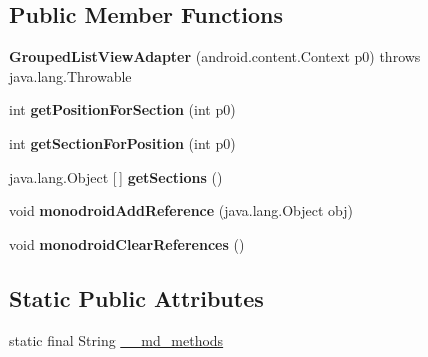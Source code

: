 \subsection*{Public Member Functions}
\begin{DoxyCompactItemize}
\item 
\mbox{\label{classmd5b60ffeb829f638581ab2bb9b1a7f4f3f_1_1GroupedListViewAdapter_ab328fe93ec4962ae6c34cea2a24a4897}} 
{\bfseries Grouped\+List\+View\+Adapter} (android.\+content.\+Context p0)  throws java.\+lang.\+Throwable 	
\item 
\mbox{\label{classmd5b60ffeb829f638581ab2bb9b1a7f4f3f_1_1GroupedListViewAdapter_af2a7abf78786d757e59276b12b020f80}} 
int {\bfseries get\+Position\+For\+Section} (int p0)
\item 
\mbox{\label{classmd5b60ffeb829f638581ab2bb9b1a7f4f3f_1_1GroupedListViewAdapter_a568104d4fe51eda51f33509906fb056d}} 
int {\bfseries get\+Section\+For\+Position} (int p0)
\item 
\mbox{\label{classmd5b60ffeb829f638581ab2bb9b1a7f4f3f_1_1GroupedListViewAdapter_a5303b39042c865b22540785f37da5a3e}} 
java.\+lang.\+Object \mbox{[}$\,$\mbox{]} {\bfseries get\+Sections} ()
\item 
\mbox{\label{classmd5b60ffeb829f638581ab2bb9b1a7f4f3f_1_1GroupedListViewAdapter_adbd6d6284566d262ab2a3d9a44e0f906}} 
void {\bfseries monodroid\+Add\+Reference} (java.\+lang.\+Object obj)
\item 
\mbox{\label{classmd5b60ffeb829f638581ab2bb9b1a7f4f3f_1_1GroupedListViewAdapter_a4634afbff45178960582fdfba5d55008}} 
void {\bfseries monodroid\+Clear\+References} ()
\end{DoxyCompactItemize}
\subsection*{Static Public Attributes}
\begin{DoxyCompactItemize}
\item 
static final String \hyperlink{classmd5b60ffeb829f638581ab2bb9b1a7f4f3f_1_1GroupedListViewAdapter_ae887eb8c51f6679bbffdba979210ff48}{\+\_\+\+\_\+md\+\_\+methods}
\end{DoxyCompactItemize}
